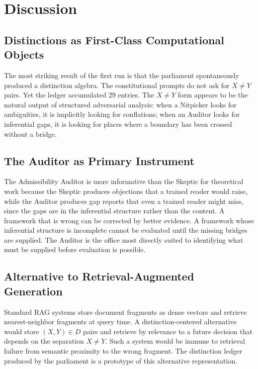 \documentclass[12pt, a4paper]{article}
\theoremstyle{principle}
\theoremstyle{definition}
\begin{document}
\section{Discussion}

\subsection{Distinctions as First-Class Computational Objects}

The most striking result of the first run is that the parliament spontaneously
produced a distinction algebra. The constitutional prompts do not ask for
$X \neq Y$ pairs. Yet the ledger accumulated 29 entries. The $X \neq Y$ form
appears to be the natural output of structured adversarial analysis: when a
Nitpicker looks for ambiguities, it is implicitly looking for conflations; when
an Auditor looks for inferential gaps, it is looking for places where a boundary
has been crossed without a bridge.

\subsection{The Auditor as Primary Instrument}

The Admissibility Auditor is more informative than the Skeptic for theoretical
work because the Skeptic produces objections that a trained reader would raise, while
the Auditor produces gap reports that even a trained reader might miss, since the
gaps are in the inferential structure rather than the content. A framework that is
wrong can be corrected by better evidence. A framework whose inferential structure
is incomplete cannot be evaluated until the missing bridges are supplied. The Auditor
is the office most directly suited to identifying what must be supplied before
evaluation is possible.

\subsection{Alternative to Retrieval-Augmented Generation}

Standard RAG systems store document fragments as dense vectors and retrieve
nearest-neighbor fragments at query time. A distinction-centered alternative would
store $(X, Y) \in D$ pairs and retrieve by relevance to a future decision that
depends on the separation $X \neq Y$. Such a system would be immune to retrieval
failure from semantic proximity to the wrong fragment. The distinction ledger
produced by the parliament is a prototype of this alternative representation.
\end{document}

